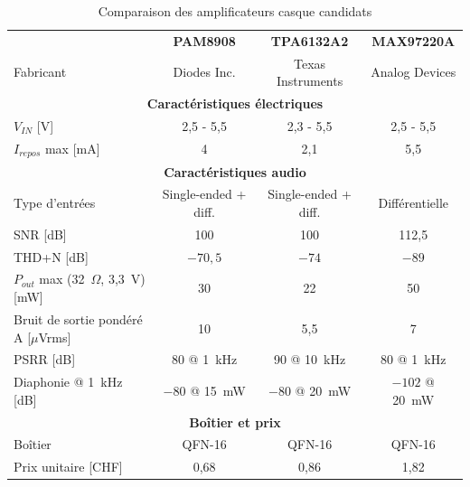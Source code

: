 \begin{table}[H]
  \centering
  \renewcommand{\arraystretch}{1.25}
  \caption{Comparaison des amplificateurs casque candidats}
  \label{tab:comparo_ampli}
  \footnotesize
  \begin{tabular}{l c c >{\columncolor{teal!12}}c}
    \hline
                                            & \makecell{\textbf{PAM8908}                                         \\\cite{diodes_inc_PAM8908}} & \makecell{\textbf{TPA6132A2}\\\cite{TI_TPA6132A2}} & \makecell{\textbf{MAX97220A}\\\cite{analog_MAX97220A}} \\
    Fabricant                               & Diodes Inc.                & Texas Instruments    & Analog Devices \\
    \hline
    \multicolumn{4}{c}{\textbf{Caractéristiques électriques}}                                                    \\
    \hline
    $V_{IN}$ [V]                            & 2,5 - 5,5                  & 2,3 - 5,5            & 2,5 - 5,5      \\
    $I_{repos}$ max [mA]                    & 4                          & 2,1                  & 5,5            \\
    \hline
    \multicolumn{4}{c}{\textbf{Caractéristiques audio}}                                                          \\
    \hline
    Type d'entrées                          & Single-ended + diff.       & Single-ended + diff. & Différentielle \\
    SNR [dB]                                & 100                        & 100                  & 112,5          \\
    THD+N [dB]                              & $-70{,}5$                  & $-74$                & $-89$          \\
    $P_{out}$ max (32~$\Omega$, 3,3~V) [mW] & 30                         & 22                   & 50             \\
    Bruit de sortie pondéré A [$\mu$Vrms]   & 10                         & 5,5                  & 7              \\
    PSRR [dB]                               & 80 @ 1~kHz                 & 90 @ 10~kHz          & 80 @ 1~kHz     \\
    Diaphonie @ 1~kHz [dB]                  & $-80$ @ 15~mW              & $-80$ @ 20~mW        & $-102$ @ 20~mW \\
    \hline
    \multicolumn{4}{c}{\textbf{Boîtier et prix}}                                                                 \\
    \hline
    Boîtier                                 & QFN-16                     & QFN-16               & QFN-16         \\
    Prix unitaire [CHF]                     & 0,68                       & 0,86                 & 1,82           \\
    \hline
  \end{tabular}
\end{table}

